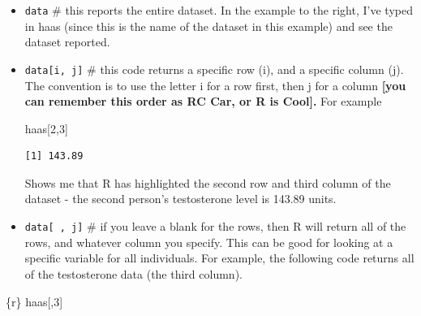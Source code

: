 \documentclass[
  letterpaper,
  DIV=11,
  numbers=noendperiod,
  oneside]{scrreprt}
\newenvironment{Shaded}{\begin{snugshade}}{\end{snugshade}}
\newcommand{\DecValTok}[1]{\textcolor[rgb]{0.68,0.00,0.00}{#1}}
\newcommand{\InformationTok}[1]{\textcolor[rgb]{0.37,0.37,0.37}{#1}}
\newcommand{\NormalTok}[1]{\textcolor[rgb]{0.00,0.23,0.31}{#1}}
\begin{document}
\begin{itemize}
\item
  \texttt{data} \# this reports the entire dataset. In the example to
  the right, I've typed in haas (since this is the name of the dataset
  in this example) and see the dataset reported.
\item
  \texttt{data{[}i,\ j{]}} \# this code returns a specific row (i), and
  a specific column (j). The convention is to use the letter i for a row
  first, then j for a column \textbf{{[}you can remember this order as
  RC Car, or R is Cool{]}.} For example

\begin{Shaded}
\begin{Highlighting}[]
\NormalTok{haas[}\DecValTok{2}\NormalTok{,}\DecValTok{3}\NormalTok{]}
\end{Highlighting}
\end{Shaded}

\begin{verbatim}
[1] 143.89
\end{verbatim}

  Shows me that R has highlighted the second row and third column of the
  dataset - the second person's testosterone level is 143.89 units.
\item
  \texttt{data{[}\ ,\ j{]}} \# if you leave a blank for the rows, then R
  will return all of the rows, and whatever column you specify. This can
  be good for looking at a specific variable for all individuals. For
  example, the following code returns all of the testosterone data (the
  third column).
\end{itemize}

\begin{Shaded}
\begin{Highlighting}[]
\InformationTok{\textasciigrave{}\textasciigrave{}\textasciigrave{}\{r\}}
\InformationTok{haas[,3]}
\InformationTok{\textasciigrave{}\textasciigrave{}\textasciigrave{}}
\end{Highlighting}
\end{Shaded}
\end{document}
